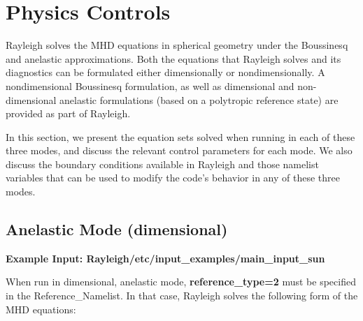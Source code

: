 \clearpage
\section{Physics Controls}\label{sec:physics}
Rayleigh solves the MHD equations in spherical geometry under the Boussinesq and anelastic approximations.  Both the equations that Rayleigh solves and its diagnostics can be formulated either dimensionally or nondimensionally.  A nondimensional Boussinesq formulation, as well as dimensional and non-dimensional anelastic formulations (based on a polytropic reference state) are provided as part of Rayleigh.

In this section, we present the equation sets solved when running in each of these three modes, and discuss the relevant control parameters for each mode.   We also discuss the boundary conditions available in Rayleigh and those namelist variables that can be used to modify the code's behavior in any of these three modes.

\subsection{Anelastic Mode (dimensional)}

\textbf{Example Input:  Rayleigh/etc/input\_examples/main\_input\_sun}

When run in dimensional, anelastic mode, \textbf{reference\_type=2} must be specified in the Reference\_Namelist.  In that case, Rayleigh solves the following form of the MHD equations:



